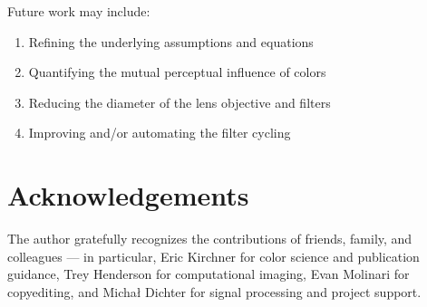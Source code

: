 \documentclass[twocolumn,10pt]{asme2ej}
\newcommand{\id}{\hspace{6 mm}}
\begin{document}
\id Future work may include:

\begin{enumerate}
\item Refining the underlying assumptions and equations
\item Quantifying the mutual perceptual influence of colors
\item Reducing the diameter of the lens objective and filters 
\item Improving and/or automating the filter cycling
\end{enumerate}

\section{Acknowledgements}

The author gratefully recognizes the contributions of friends, family, and colleagues --- in particular, Eric Kirchner for color science and publication guidance, Trey Henderson for computational imaging, Evan Molinari for copyediting, and Michał Dichter for signal processing and project support.

\end{document}
